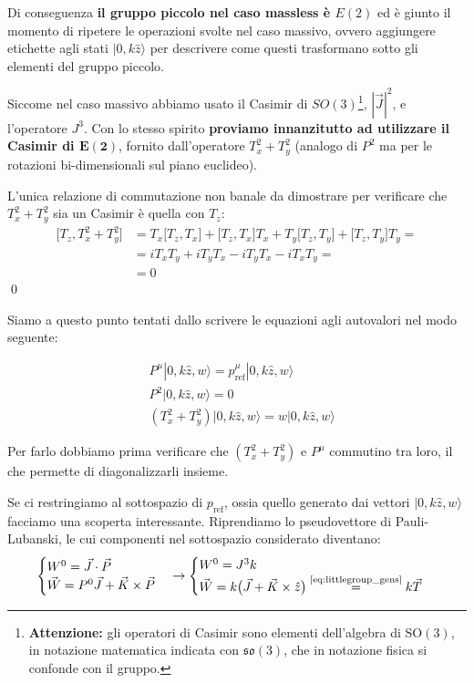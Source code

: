 \documentclass[../main.tex]{subfiles}
\begin{document}
Di conseguenza \textbf{il gruppo piccolo nel caso massless è $E(2)$} ed è giunto il momento di ripetere le operazioni svolte nel caso massivo, ovvero aggiungere etichette agli stati $|0,k\hat{z}\rangle$ per descrivere come questi trasformano sotto gli elementi del gruppo piccolo.

Siccome nel caso massivo abbiamo usato il Casimir di ${SO}(3)$\footnote{\textbf{Attenzione:} gli operatori di Casimir sono elementi dell'algebra di $\text{SO}(3)$, in notazione matematica indicata con $\mathfrak{so}(3)$, che in notazione fisica si confonde con il gruppo.}, $|\Vec{J}|^2$, e l'operatore $J^3$. Con lo stesso spirito \textbf{proviamo innanzitutto ad utilizzare il Casimir di $\mathbf{E(2)}$}, fornito dall'operatore \(T_x^2 + T_y^2\) (analogo di $P^2$ ma per le rotazioni bi-dimensionali sul piano euclideo). 
\begin{nota}
    L'unica relazione di commutazione non banale da dimostrare per verificare che \(T_x^2 + T_y^2\) sia un Casimir è quella con $T_z$:
    \[
    \begin{aligned}
        \big[T_z, T_x^2 + T_y^2\big] &= T_x\big[T_z, T_x\big] +\big[T_z, T_x\big]T_x + T_y\big[T_z, T_y\big] +\big[T_z, T_y\big]T_y = \\
        &= iT_xT_y +iT_yT_x - iT_yT_x  - iT_xT_y =\\  
        &= 0
    \end{aligned}
    \]\qed
\end{nota}

Siamo a questo punto tentati dallo scrivere le equazioni agli autovalori nel modo seguente:

\[
{
\begin{aligned}
    &P^\mu|0, k\hat{z}, w\rangle = p^\mu_\text{ref}|0, k\hat{z}, w\rangle\\
    &P^2|0, k\hat{z}, w\rangle = 0 \\
    &(T_x^2 + T_y^2)|0, k\hat{z}, w\rangle = w |0, k\hat{z}, w\rangle
\end{aligned}
}
\]

Per farlo dobbiamo prima verificare che \((T_x^2 + T_y^2)\) e \(P^\mu\) commutino tra loro, il che permette di diagonalizzarli insieme.

Se ci restringiamo al sottospazio di $p_\text{ref}$, ossia quello generato dai vettori \(|0, k\hat{z}, w\rangle\) facciamo una scoperta interessante. Riprendiamo lo pseudovettore di Pauli-Lubanski, le cui componenti nel sottospazio considerato diventano:
\[
\begin{cases}
    W^0 = \Vec{J}\cdot\Vec{P} \\
    \Vec{W} = P^0\Vec{J} + \Vec{K}\times\Vec{P}
\end{cases}
\rightarrow
\begin{cases}
    W^0 = J^3 k \\
    \Vec{W} = k\big(\Vec{J} + \Vec{K}\times\hat{z}\big) \overset{\text{\ref{eq:littlegroup_gens}}}{=} k\Vec{T}
\end{cases}
\]
\end{document}
